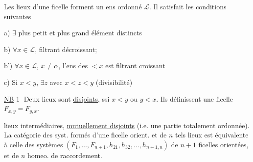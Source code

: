 
Les lieux d'une ficelle  forment un ens ordonné $\mathcal L$. Il satisfait les conditions suivantes

a) $\exists$ plus petit et plus grand élément  distincts

b) $\forall x\in\mathcal L$,   filtrant décroissant;

b') $\forall x\in\mathcal L$, $x\ne\alpha$, l'ens des  $<x$ est filtrant croissant

c) Si $x<y$, $\exists z$ avec $x<z<y$ (divisibilité)

\uline{NB} \textcircled{1} Deux lieux  sont \uline{disjoints},  ssi $x<y$ ou $y<x$. Ils définissent une ficelle $F_{x,y}=F_{y,x}$.


 lieux intermédiaires, \uline{mutuellement disjoints} (i.e.  une partie totalement ordonnée). La catégorie des syst. formés d'une ficelle orient.  et de $n$ tels lieux  est équivalente à celle des systèmes $(F_1,\ldots,F_{n+1},h_{21},h_{32},\ldots,h_{n+1,n})$ de $n+1$ ficelles orientées, et de $n$ homeo. de raccordement.

